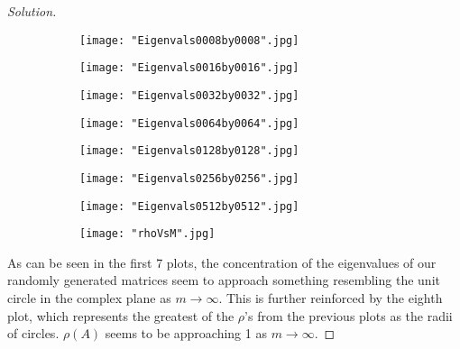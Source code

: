 \documentclass{article}
\begin{document}
	\begin{proof}[Solution]
	\begin{figure}[h!]
	\centering
	  \begin{subfigure}[b]{0.45\linewidth}
  	\texttt{[image: "Eigenvals0008by0008".jpg]}
  \end{subfigure}
  \begin{subfigure}[b]{0.45\linewidth}
    \texttt{[image: "Eigenvals0016by0016".jpg]}
  \end{subfigure}
	\end{figure}
	
	\begin{figure}[h!]
	\centering
	  \begin{subfigure}[b]{0.45\linewidth}
  	\texttt{[image: "Eigenvals0032by0032".jpg]}
  \end{subfigure}
  \begin{subfigure}[b]{0.45\linewidth}
    \texttt{[image: "Eigenvals0064by0064".jpg]}
  \end{subfigure}
	\end{figure}
	
	\begin{figure}[h!]
	\centering
	  \begin{subfigure}[b]{0.45\linewidth}
  	\texttt{[image: "Eigenvals0128by0128".jpg]}
  \end{subfigure}
  \begin{subfigure}[b]{0.45\linewidth}
    \texttt{[image: "Eigenvals0256by0256".jpg]}
  \end{subfigure}
	\end{figure}
	
	\begin{figure}[h!]
	\centering
	  \begin{subfigure}[b]{0.45\linewidth}
  	\texttt{[image: "Eigenvals0512by0512".jpg]}
  \end{subfigure}
  \begin{subfigure}[b]{0.45\linewidth}
    \texttt{[image: "rhoVsM".jpg]}
  \end{subfigure}
	\end{figure} 
	
	As can be seen in the first 7 plots, the concentration of the eigenvalues of our randomly generated matrices seem to approach something resembling the unit circle in the complex plane as $m \to \infty$. This is further reinforced by the eighth plot, which represents the greatest of the $\rho$'s from the previous plots as the radii of circles. $\rho\left(A\right)$ seems to be approaching 1 as $m \to \infty$.
		\end{proof}
\end{document}
